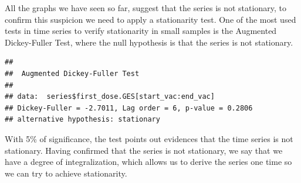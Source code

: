 \documentclass[
]{article}
\newenvironment{Shaded}{\begin{snugshade}}{\end{snugshade}}
\newcommand{\DecValTok}[1]{\textcolor[rgb]{0.00,0.00,0.81}{#1}}
\newcommand{\DocumentationTok}[1]{\textcolor[rgb]{0.56,0.35,0.01}{\textbf{\textit{#1}}}}
\newcommand{\FunctionTok}[1]{\textcolor[rgb]{0.13,0.29,0.53}{\textbf{#1}}}
\newcommand{\NormalTok}[1]{#1}
\newcommand{\OtherTok}[1]{\textcolor[rgb]{0.56,0.35,0.01}{#1}}
\newcommand{\SpecialCharTok}[1]{\textcolor[rgb]{0.81,0.36,0.00}{\textbf{#1}}}
\renewenvironment{Shaded}{\begin{mdframed}[ backgroundcolor=shadecolor, linecolor = shadecolor, leftmargin=\dimexpr\leftmargin-2pt\relax, innerleftmargin=1.6pt, innertopmargin=5pt, skipabove=10pt,skipbelow=3pt ]}{\end{mdframed}}
\begin{document}
All the graphs we have seen so far, suggest that the series is not
stationary, to confirm this suspicion we need to apply a stationarity
test. One of the most used tests in time series to verify stationarity
in small samples is the Augmented Dickey-Fuller Test, where the null
hypothesis is that the series is not stationary.

\begin{Shaded}
\end{Shaded}

\begin{verbatim}
## 
##  Augmented Dickey-Fuller Test
## 
## data:  series$first_dose.GES[start_vac:end_vac]
## Dickey-Fuller = -2.7011, Lag order = 6, p-value = 0.2806
## alternative hypothesis: stationary
\end{verbatim}

With 5\% of significance, the test points out evidences that the time
series is not stationary. Having confirmed that the series is not
stationary, we say that we have a degree of integralization, which
allows us to derive the series one time so we can try to achieve
stationarity.
\end{document}
